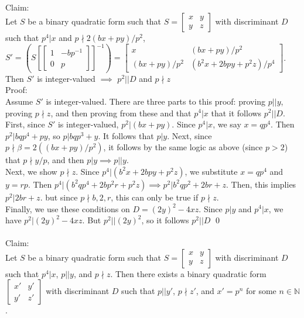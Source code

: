 \documentclass[11pt, oneside]{amsart}
\begin{document}
\subsubsection{}
 \quad \\
Claim:
\\
Let $S$ be a binary quadratic form such that $S=
\begin{bmatrix}
x &	y \\
y & z
\end{bmatrix}$ with discriminant $D$ 
\\
such that $p^4\vert x$ and $p\nmid 2(bx+py)/p^2$, $S'=(S[
\begin{bmatrix}
1 &	-bp^{-1} \\
0 & p
\end{bmatrix}
]^{-1})=\begin{bmatrix}
x &	(bx +py)/p^2 \\
(bx+py)/p^2 & (b^2x+2bpy+p^2z)/p^4
\end{bmatrix}$. Then $S'$ is integer-valued $\implies$ $p^2\vert\vert D$ and $p\nmid z$
\\
Proof:
\\
Assume $S'$ is integer-valued. There are three parts to this proof: proving $p\vert\vert y$, proving $ p\nmid z$, and then proving from these and that $p^4\vert x$ that it follows $p^2\vert\vert D$. First, since $S'$ is integer-valued, $p^2\vert (bx+py)$. Since $p^4\vert x$, we say $x=qp^4$. Then $p^2\vert bqp^4+py$, so $p\vert bqp^3+y$. It follows that $p\vert y$. Next, since $p\nmid \beta=2((bx+py)/p^2)$, it follows by the same logic as above (since $p>2$) that $p\nmid y/p$, and then $p\vert y \implies p\vert\vert y$.
\\
Next, we show $p\nmid z$. Since $p^4\vert (b^2x+2bpy+p^2z)$, we substitute $x=qp^4$ and $y=rp$. Then $p^4\vert (b^2qp^4+2bp^2r+p^2z) \implies p^2\vert b^2qp^2+2br+z$.  Then, this implies $p^2\vert 2br+z$. but since $p\nmid b, 2, r$, this can only be true if $p\nmid z$.
\\
Finally, we use these conditions on $D=(2y)^2-4xz$. Since $p\vert y$ and $p^4\vert x$, we have $p^2\vert (2y)^2-4xz$. But $p^2\vert\vert (2y)^2$, so it follows $p^2\vert\vert D$ \qed
\\
\\
Claim:
\\
Let $S$ be a binary quadratic form such that $S=
\begin{bmatrix}
x &	y \\
y & z
\end{bmatrix}$ with discriminant $D$ such that $p^4\vert x$, $p\vert \vert y$, and $p\nmid z$. Then there exists a binary quadratic form $\begin{bmatrix}
x' & y' \\
y' & z'
\end{bmatrix}$ with discriminant $D$ such that $p\vert \vert y'$, $p\nmid z'$, and $x'=p^n$ for some $n\in \mathbb{N}$.
\end{document}
